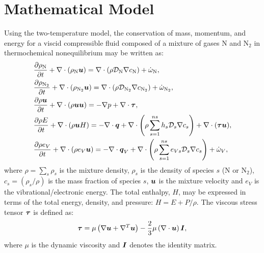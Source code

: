\documentclass[10pt]{article}
\newcommand{\diff}[2] {\dfrac{\partial #1 }{\partial #2}}
\newcommand{\bv}[1]{\ensuremath{\mbox{\boldmath$ #1 $}}}
\newcommand{\bt}[1]{\ensuremath{\mbox{\boldmath$ #1 $}}}
\newcommand{\N}{\text{N}}
\begin{document}
\section{Mathematical Model}
Using the two-temperature model, the conservation of mass, momentum, and energy for a viscid compressible fluid composed of a  mixture of gases N and N$_2$ in thermochemical nonequilibrium may be written as:
\begin{align}
\label{eq:ns:rhoN}
&\diff{\rho_{\N}}{t} + \nabla \cdot \left(\rho_{\text{N}} \bv{u}\right) = \nabla\cdot\left(\rho \mathcal{D}_{\N} \nabla c_{\N} \right) + \dot{\omega}_{\text{N}},\vspace{5pt} \\
 \label{eq:ns:rhoN2}
&\diff{\rho_{\N_2}}{t} + \nabla \cdot \left(\rho_{\text{N}_2}\bv{u}\right) =\nabla\cdot\left(\rho \mathcal{D}_{\N_2} \nabla c_{\N_2} \right) + \dot{\omega}_{\text{N}_2},\vspace{5pt}\\
\label{eq:ns:u}
&\diff{\rho \bv{u}}{t} + \nabla\cdot\left(\rho\bv{u}\bv{u}\right) = -\nabla p + \nabla \cdot \bv{\tau},\vspace{5pt} \\
\label{eq:ns:E}
&\diff{\rho E}{t} + \nabla\cdot\left(\rho \bv{u} H\right) = -\nabla \cdot\bv{q} +\nabla\cdot\left(\rho \sum_{s=1}^{ns} h_s \mathcal{D}_s \nabla c_s\right)+ \nabla \cdot (\bv{\tau u}),\vspace{5pt} \\
\label{eq:ns:eV}
&\diff{\rho e_V}{t} +\nabla\cdot (\rho e_V \bv{u})= -\nabla \cdot \bv{q}_V + \nabla\cdot\left(\rho \sum_{s=1}^{ns} e_{Vs} \mathcal{D}_s \nabla{c_s}\right) + \dot{\omega}_V ,
\end{align}
%
where $\rho=\sum_s \rho_s$ is the mixture density, $\rho_s$ is the density of species $s$ (N or N$_2$), $c_s=\left(\rho_s/\rho\right)$ is the mass fraction of species $s$, $ \bv{u} $ is the mixture velocity and $e_V$ is  the vibrational/electronic energy. %
%
 The total enthalpy, $H$, may be expressed in terms of the total energy, density, and pressure: $H = E + P/\rho$.  The viscous stress tensor $\bt{\tau}$ is defined as: %
$$  \label{eq:stress_tensor}
 \bv{\tau} = \mu\left(\nabla{\bv{u}} + \nabla^{T}{\bv{u}}\right) -\frac{2}{3}\mu \left(\nabla{}\cdot\bv{u}\right)\bt{I} ,
$$
where $\mu$ is the dynamic viscosity and $\bt{I}$ denotes the identity matrix.  
\end{document}
